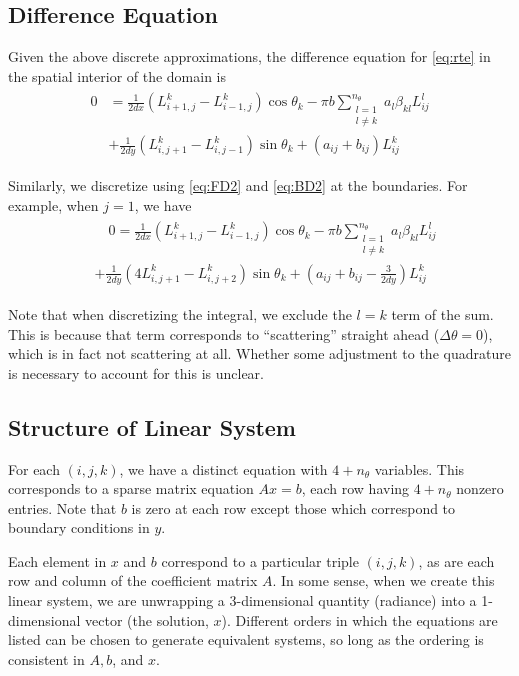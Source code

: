\documentclass[10pt]{article}
\begin{document}
\begin{multicols}{2}
\subsection{Difference Equation}
Given the above discrete approximations, the difference equation for \eqref{eq:rte} in the spatial interior of the domain is
\begin{align}
    \label{eq:diffeq}
    \begin{split}
    0 &= \frac{1}{2dx}\left(L_{i+1,j}^k - L_{i-1,j}^k\right) \cos\theta_k
    - \pi b \sum_{\substack{l=1\\ l\neq k}}^{n_\theta} a_l\beta_{kl}L_{ij}^l \\
    &+ \frac{1}{2dy}\left(L_{i,j+1}^k - L_{i,j-1}^k\right) \sin\theta_k
    + (a_{ij} + b_{ij})L_{ij}^k
    \end{split}
\end{align}

Similarly, we discretize using \eqref{eq:FD2} and \eqref{eq:BD2} at the boundaries.
For example, when $j=1$, we have
\begin{align}
    \label{eq:diffeq_bc}
    \begin{split}
    &\quad0 = \frac{1}{2dx}\left(L_{i+1,j}^k - L_{i-1,j}^k\right) \cos\theta_k
    - \pi b \sum_{\substack{l=1\\ l\neq k}}^{n_\theta} a_l\beta_{kl}L_{ij}^l \\
	&+ \frac{1}{2dy}\left(4L_{i,j+1}^k - L_{i,j+2}^k\right) \sin\theta_k
	+ (a_{ij} + b_{ij} -\frac{3}{2dy})L_{ij}^k
    \end{split}
\end{align}

Note that when discretizing the integral, we exclude the $l=k$ term of the sum.
This is because that term corresponds to ``scattering'' straight ahead ($\Delta\theta=0$), which is in fact not scattering at all.
Whether some adjustment to the quadrature is necessary to account for this is unclear.

\subsection{Structure of Linear System}
For each $(i,j,k)$, we have a distinct equation with $4+n_\theta$ variables.
This corresponds to a sparse matrix equation $Ax=b$, each row having $4+n_\theta$ nonzero entries.
Note that $b$ is zero at each row except those which correspond to boundary conditions in $y$.

Each element in $x$ and $b$ correspond to a particular triple $(i,j,k)$, as are each row and column of the coefficient matrix $A$.
In some sense, when we create this linear system, we are unwrapping a 3-dimensional quantity (radiance) into a 1-dimensional vector (the solution, $x$).
Different orders in which the equations are listed can be chosen to generate equivalent systems, so long as the ordering is consistent in $A,b$, and $x$.


\end{multicols}
\end{document}
